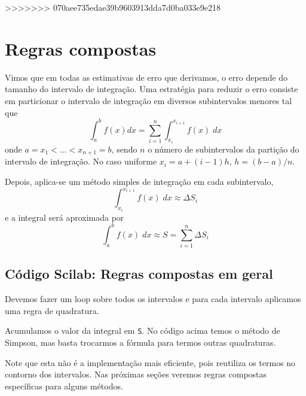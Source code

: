 >>>>>>> 070aee735edae39b9603913dda7d0ba033e9e218








\section{Regras compostas}

Vimos que em todas as estimativas de erro que derivamos, o erro depende do tamanho do intervalo de integração. Uma estratégia para reduzir o erro consiste em particionar o intervalo de integração em diversos subintervalos menores tal que
\begin{equation*}
\int_{a}^b f(x)dx=\sum_{i=1}^{n} \int_{x_i}^{x_{i+1}} f(x)\;dx 
\end{equation*}
onde $a=x_1<...<x_{n+1}=b$, sendo $n$ o número de subintervalos da partição do intervalo de integração. No caso uniforme $x_i = a + (i-1)h$, $h = (b-a)/n$.

Depois, aplica-se um método simples de integração em cada subintervalo,
$$
\int_{x_i}^{x_{i+1}} f(x)\;dx \approx \Delta S_i
$$
e a integral será aproximada por
$$
\int_a^b f(x)\;dx \approx S= \sum_{i=1}^{n} \Delta S_i
$$

\ifisscilab
\subsection{Código Scilab: Regras compostas em geral}
Devemos fazer um loop sobre todos os intervalos e para cada intervalo aplicamos uma regra de quadratura. 



Acumulamos o valor da integral em \verb+S+. No código acima temos o método de Simpson, mas basta trocarmos a fórmula para termos outras quadraturas.

Note que esta não é a implementação mais eficiente, pois reutiliza os termos no contorno dos intervalos. Nas próximas seções veremos regras compostas específicas para alguns métodos.
\fi

